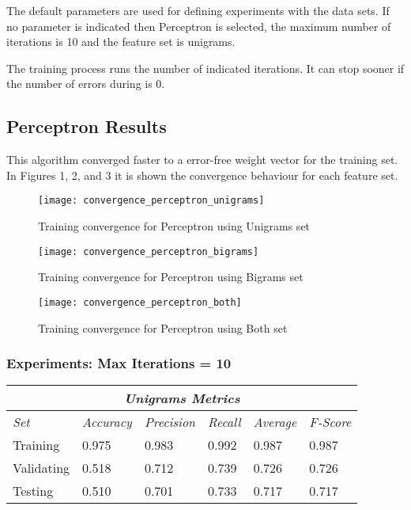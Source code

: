 \documentclass[11pt]{article}
\begin{document}
The default parameters are used for defining experiments with the data sets. If no parameter is indicated then Perceptron is selected, the maximum number of iterations is 10 and the feature set is unigrams.

The training process runs the number of indicated iterations. It can stop sooner if the number of errors during is 0.

\subsection{Perceptron Results}

This algorithm converged faster to a error-free weight vector for the training set. In Figures 1, 2, and 3 it is shown the convergence behaviour for each feature set. 

\begin{figure}[h]
\centering
\texttt{[image: convergence\_perceptron\_unigrams]}
\caption{Training convergence for Perceptron using Unigrams set}
\end{figure}

\begin{figure}[h]
\centering
\texttt{[image: convergence\_perceptron\_bigrams]}
\caption{Training convergence for Perceptron using Bigrams set}
\end{figure}

\begin{figure}[h]
\centering
\texttt{[image: convergence\_perceptron\_both]}
\caption{Training convergence for Perceptron using Both set}
\end{figure}

\subsubsection{Experiments: Max Iterations = 10}

\begin{tabular}{ |p{2cm}||p{2cm}|p{2cm}|p{2cm}|p{2cm}|p{2cm}|  }
 \hline
 \multicolumn{6}{|c|}{\textbf{\textit{Unigrams Metrics}}} \\
 \hline
 \textit{Set} & \textit{Accuracy} & \textit{Precision} & \textit{Recall} & \textit{Average} & \textit{F-Score} \\
 \hline
 Training   & 0.975 & 0.983 & 0.992 & 0.987 & 0.987 \\
 Validating & 0.518 & 0.712 & 0.739 & 0.726 & 0.726 \\
 Testing    & 0.510 & 0.701 & 0.733 & 0.717 & 0.717 \\
 \hline
\end{tabular}
\end{document}
